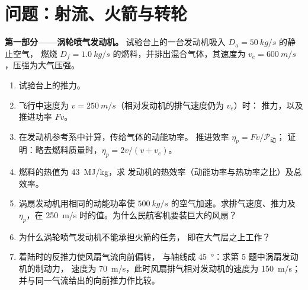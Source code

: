\section{问题：射流、火箭与转轮}

\begin{problem}
\label{pb:b2:flow-balances:1}

\medskip
\noindent\textbf{第一部分——涡轮喷气发动机。}
试验台上的一台发动机吸入 $D_a = \qty{50}{kg/s}$ 的静止空气，
燃烧 $D_f = \qty{1.0}{kg/s}$ 的燃料，并排出混合气体，其速度为 $v_e =
\qty{600}{m/s}$，压强为大气压强。
\begin{enumerate}
  \item 试验台上的推力。
  \item 飞行中速度为 $v = \qty{250}{m/s}$（相对发动机的排气速度仍为 $v_e$）时：
        推力，以及推进功率 $Fv$。
  \item 在发动机参考系中计算，传给气体的动能功率。
        推进效率 $\eta_p = Fv/\mathcal P_{\text{动}}$；
        证明：略去燃料质量时，$\eta_p = 2v/(v + v_e)$。
  \item 燃料的热值为 \qty{43}{MJ/kg}，求
        发动机的热效率（动能功率与热功率之比）及总效率。
  \item 涡扇发动机用相同的动能功率使
        $\qty{500}{kg/s}$ 的空气加速。求排气速度、推力及 $\eta_p$，在
        \qty{250}{m/s} 时的值。为什么民航客机要装巨大的风扇？
  \item 为什么涡轮喷气发动机不能承担火箭的任务，
        即在大气层之上工作？
  \item 着陆时的反推力使风扇气流向前偏转，
        与轴线成 \qty{45}{\degree}：求第 5 题中涡扇发动机的制动力，
        速度为 \qty{70}{m/s}，此时风扇排气相对发动机的速度为
        \qty{150}{m/s}；
        并与同一气流给出的向前推力作比较。
\end{enumerate}


\end{problem}
